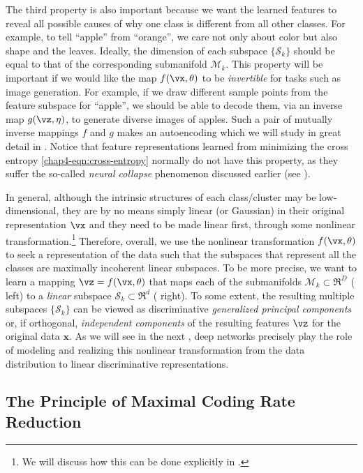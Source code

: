 \documentclass[../../book-main.tex]{subfiles}
\begin{document}
The third property is also important because we want the learned
features to reveal all possible causes of why one class is different
from all other classes. For example, to tell ``apple'' from
``orange'', we care not only about color but also shape and the
leaves. Ideally, the dimension of each subspace $\{\mathcal{S}_k\}$
should be equal to that of the corresponding submanifold
$\mathcal{M}_k$. This property will be important if we would like the
map $f(\vx,\theta)$ to be {\em invertible} for tasks such as image
generation. For example, if we draw different sample points from the
feature subspace for ``apple'', we should be able to decode them, via
an inverse map $g(\vz, \eta)$, to generate diverse images of apples.
Such a pair of mutually inverse mappings $f$ and $g$ makes an
autoencoding which we will study in great detail in
. Notice that feature
representations learned
from minimizing the cross entropy \eqref{chap4-eqn:cross-entropy}
normally do not have this property, as they suffer the so-called {\em
neural   collapse} phenomenon discussed earlier (see
).

In general, although the intrinsic structures of each class/cluster
may be low-dimensional, they are by no means simply linear (or
Gaussian) in their original representation $\vx$ and they need to be
made linear first, through some nonlinear transformation.\footnote{We
    will discuss how this can be done explicitly in
.} Therefore, overall, we use
the nonlinear
transformation $f(\vx,\theta)$ to seek a representation of the data
such that the subspaces that represent all the classes are maximally
incoherent linear subspaces. To be more precise, we want to learn a
mapping {$\vz = f(\vx,\theta)$} that maps each of the submanifolds
$\mathcal{M}_k \subset \Re^D$ ( left) to
a {\em linear} subspace $\mathcal{S}_k \subset \Re^d$
( right). To some extent, the resulting
multiple subspaces $\{\mathcal{S}_k\}$ can be viewed as
discriminative {\em generalized principal components} \cite{GPCA} or,
if orthogonal, {\em independent components}
\cite{hyvarinen2000independent} of the resulting features $\vz$ for
the original data $\bm x$.
As we will see in the next , deep networks
precisely play the role of modeling and realizing this nonlinear
transformation from the data distribution to linear discriminative
representations.

\subsection{The Principle of Maximal Coding Rate
Reduction}\label{subsec:MCR2}
\end{document}

